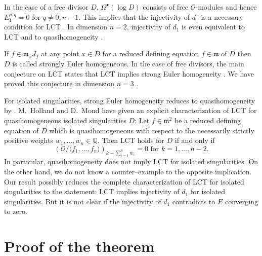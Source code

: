 \documentclass{amsart}
\theoremstyle{definition}
\theoremstyle{plain}
\theoremstyle{remark}
\newcommand{\m}{\mathfrak{m}}
\renewcommand{\O}{\mathcal{O}}
\newcommand{\Q}{\mathbb{Q}}
\begin{document}
In the case of a free divisor $D$, $\Omega^\bullet(\log D)$ consists of free $\O$-modules and hence $E_1^{p,q}=0$ for $q\ne0,n-1$.
This implies that the injectivity of $d_1$ is a necessary condition for LCT  \cite[Sect.~3]{CMNC02}.
In dimension $n=2$, injectivity of $d_1$ is even equivalent to LCT and to quasihomogeneity \cite[Thm.~3.5]{CMNC02}.

If $f\in\m_xJ_f$ at any point $x\in D$ for a reduced defining equation $f\in\m$ of $D$ then $D$ is called strongly Euler homogeneous.
In the case of free divisors, the main conjecture on LCT states that LCT implies strong Euler homogeneity \cite[Conj.~1.4]{CMNC02}.
We have proved this conjecture in dimension $n=3$ \cite{GS06}.

For isolated singularities, strong Euler homogeneity reduces to quasihomogeneity by \cite{Sai71}.
M.~Holland and D.~Mond \cite{HM98} have given an explicit characterization of LCT for quasihomogeneous isolated singularities $D$:
Let $f\in\m^2$ be a reduced defining equation of $D$ which is quasihomogeneous with respect to the necessarily strictly positive weights $w_1,\dots,w_n\in\Q$.
Then LCT holds for $D$ if and only if 
\[
(\O/\langle f_1,\dots,f_n\rangle)_{k-\sum_{i=1}^nw_i}=0\text{ for }k=1,\dots,n-2.
\]
In particular, quasihomogeneity does not imply LCT for isolated singularities.
On the other hand, we do not know a counter--example to the opposite implication.
Our result possibly reduces the complete characterization of LCT for isolated singularities to the statement:
LCT implies injectivity of $d_1$ for isolated singularities.
But it is not clear if the injectivity of $d_1$ contradicts to $\bar E$ converging to zero.


\section{Proof of the theorem}
\end{document}
